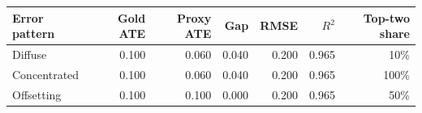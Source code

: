 \begin{tabular}{lrrrrrr}
\toprule
Error pattern & Gold ATE & Proxy ATE & Gap & RMSE & $R^2$ & Top-two share \\
\midrule
Diffuse & 0.100 & 0.060 & 0.040 & 0.200 & 0.965 & 10\% \\
Concentrated & 0.100 & 0.060 & 0.040 & 0.200 & 0.965 & 100\% \\
Offsetting & 0.100 & 0.100 & 0.000 & 0.200 & 0.965 & 50\% \\
\bottomrule
\end{tabular}
